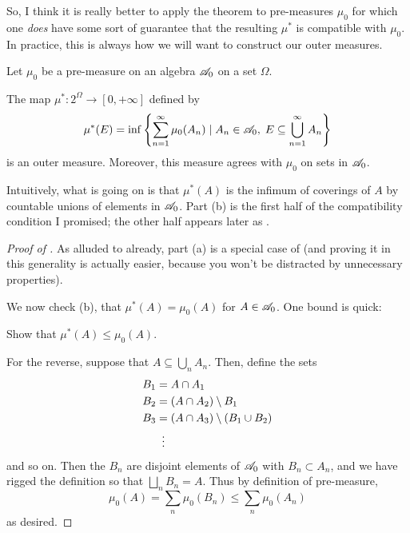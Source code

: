 So, I think it is really better to apply the theorem to pre-measures $\mu_0$
for which one \emph{does} have some sort of guarantee
that the resulting $\mu^\ast$ is compatible with $\mu_0$.
In practice, this is always how we will want to construct our outer measures.
\begin{theorem}
	\label{thm:construct_outer}
	Let $\mu_0$ be a pre-measure on an algebra $\mathscr A_0$ on a set $\Omega$.
	\begin{enumerate}[(a)]
		\ii The map $\mu^\ast \colon 2^\Omega \to [0,+\infty]$ defined by
		\[ \mu^\ast(E) = \inf \left\{ \sum_{n=1}^\infty \mu_0(A_n) \mid
			A_n \in \mathscr A_0, \; E \subseteq \bigcup_{n=1}^\infty A_n \right\} \]
		is an outer measure.
		\ii Moreover, this measure agrees with $\mu_0$ on sets in $\mathscr A_0$.
	\end{enumerate}
\end{theorem}
Intuitively, what is going on is that
$\mu^\ast(A)$ is the infimum of coverings of $A$ by
countable unions of elements in $\mathscr A_0$.
Part (b) is the first half of the compatibility condition I promised;
the other half appears later as .

\begin{proof}
	[Proof of ]
	As alluded to already, part (a)
	is a special case of 
	(and proving it in this generality is actually easier,
	because you won't be distracted by unnecessary properties).

	We now check (b), that $\mu^\ast(A) = \mu_0(A)$ for $A \in \mathscr A_0$.
	One bound is quick:
	\begin{ques}
		Show that $\mu^\ast(A) \le \mu_0(A)$.
	\end{ques}
	For the reverse, suppose that $A \subseteq \bigcup_n A_n$.
	Then, define the sets
	\begin{align*}
		B_1 &= A \cap A_1 \\
		B_2 &= (A \cap A_2) \setminus B_1 \\
		B_3 &= (A \cap A_3) \setminus (B_1 \cup B_2) \\
		&\vdotswithin=
	\end{align*}
	and so on.
	Then the $B_n$ are disjoint elements of $\mathscr A_0$ with $B_n \subset A_n$,
	and we have rigged the definition so that $\bigsqcup_n B_n = A$.
	Thus by definition of pre-measure,
	\[ \mu_0(A) = \sum_n \mu_0(B_n) \le \sum_n \mu_0(A_n) \]
	as desired.
\end{proof}

